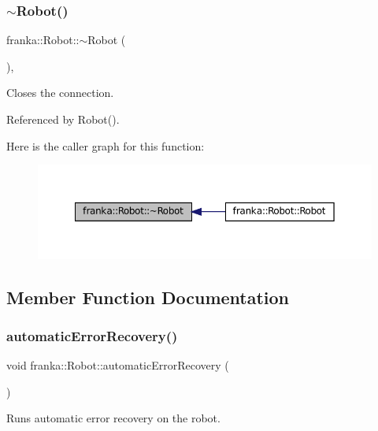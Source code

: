 \subsubsection{\texorpdfstring{$\sim$\+Robot()}{~Robot()}}
{\footnotesize\ttfamily franka\+::\+Robot\+::$\sim$\+Robot (\begin{DoxyParamCaption}{ }\end{DoxyParamCaption})\hspace{0.3cm}{\ttfamily [default]}, {\ttfamily [noexcept]}}

Closes the connection. 

Referenced by Robot().

Here is the caller graph for this function\+:
\nopagebreak
\begin{figure}[H]
\begin{center}
\leavevmode
\includegraphics[width=350pt]{classfranka_1_1Robot_a28abb25d25b5a1ce4463e32a518682e4_icgraph}
\end{center}
\end{figure}


\subsection{Member Function Documentation}
\mbox{\label{classfranka_1_1Robot_af682aa673415718715bd859116bc2fed}} 
\subsubsection{\texorpdfstring{automatic\+Error\+Recovery()}{automaticErrorRecovery()}}
{\footnotesize\ttfamily void franka\+::\+Robot\+::automatic\+Error\+Recovery (\begin{DoxyParamCaption}{ }\end{DoxyParamCaption})}

Runs automatic error recovery on the robot.


